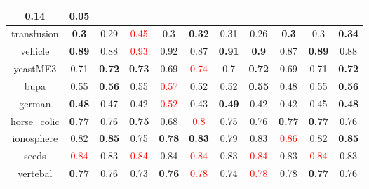 \documentclass{article}%
\begin{document}
\begin{tabular}{c|cccccccccc}
{0.14
}&0.05\\%
\hline%
transfusion&\textbf{0.3}&0.29&\textcolor{red}{ 
0.45
}&0.3&\textbf{0.32}&0.31&0.26&\textbf{0.3}&0.3&\textbf{0.34}\\%
\hline%
vehicle&\textbf{0.89}&0.88&\textcolor{red}{ 
0.93
}&0.92&0.87&\textbf{0.91}&\textbf{0.9}&0.87&\textbf{0.89}&0.88\\%
\hline%
yeastME3&0.71&\textbf{0.72}&\textbf{0.73}&0.69&\textcolor{red}{ 
0.74
}&0.7&\textbf{0.72}&0.69&0.71&\textbf{0.72}\\%
\hline%
bupa&0.55&\textbf{0.56}&0.55&\textcolor{red}{ 
0.57
}&0.52&0.52&\textbf{0.55}&0.48&0.55&\textbf{0.56}\\%
\hline%
german&\textbf{0.48}&0.47&0.42&\textcolor{red}{ 
0.52
}&0.43&\textbf{0.49}&0.42&0.42&0.45&\textbf{0.48}\\%
\hline%
horse\_colic&\textbf{0.77}&0.76&\textbf{0.75}&0.68&\textcolor{red}{ 
0.8
}&0.75&0.76&\textbf{0.77}&\textbf{0.77}&0.76\\%
\hline%
ionosphere&0.82&\textbf{0.85}&0.75&\textbf{0.78}&\textbf{0.83}&0.79&0.83&\textcolor{red}{ 
0.86
}&0.82&\textbf{0.85}\\%
\hline%
seeds&\textcolor{red}{ 
0.84
}&0.83&\textcolor{red}{ 
0.84
}&0.84&\textcolor{red}{ 
0.84
}&0.83&\textcolor{red}{ 
0.84
}&0.83&\textcolor{red}{ 
0.84
}&0.83\\%
\hline%
vertebal&\textbf{0.77}&0.76&0.73&\textbf{0.76}&\textcolor{red}{ 
0.78
}&0.74&\textcolor{red}{ 
0.78
}&0.78&\textbf{0.77}&0.76\\%
\hline%
\end{tabular}

%
\end{document}

